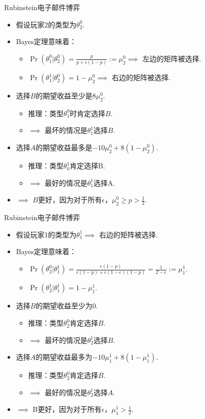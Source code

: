 \begin{frame}{Rubinstein电子邮件博弈}
\begin{itemize}
\item 假设玩家2的类型为$\theta_2^0$.
\item Bayes定理意味着：
\begin{itemize}
\item $\Pr(\theta_1^0|\theta_2^0) = \frac{p}{p+\epsilon(1-p)} := \mu_2^0\implies$  左边的矩阵被选择. 
\item $\Pr(\theta_1^1|\theta_2^0) = 1 - \mu_2^0\implies$ 右边的矩阵被选择. 
\end{itemize}
\item 选择$B$的期望收益至少是$8\mu_2^0$.
\begin{itemize}
\item 推理：类型$\theta_1^0$时肯定选择$B$.
\item $\implies$ 最坏的情况是$\theta_1^1$选择$B$.
\end{itemize}
\item 选择$A$的期望收益最多是$-10\mu_2^0 + 8(1 - \mu_2^0)$. 
\begin{itemize}
\item 推理：类型$\theta_0^1$肯定选择B. 
\item $\implies$ 最好的情况是$\theta_1^1$选择A. 

\end{itemize}
\item $\implies$ $B$更好，因为对于所有$\epsilon$，$\mu_2^0 \geq p > \frac{1}{2}$.
\end{itemize}
\end{frame}

\begin{frame}{Rubinstein电子邮件博弈}
\begin{itemize}
\item 假设玩家1的类型为$\theta_1^1$$\implies$ 右边的矩阵被选择. 
\item Bayes定理意味着：
\begin{itemize}
    \item $\Pr(\theta_2^0|\theta_1^1) = \frac{\epsilon(1-p)}{\epsilon(1-p)+\epsilon(1-\epsilon)(1-p)} = \frac{1}{2-\epsilon} := \mu_1^1$. 
\item $\Pr(\theta_2^1|\theta_1^1) = 1 - \mu_1^1$. 
\end{itemize}
\item 选择$B$的期望收益至少为$0$. 
\begin{itemize}
    \item 推理：类型$\theta_2^0$肯定选择$B$. 
    \item $\implies$ 最坏的情况是$\theta_2^1$选择$B$. 
\end{itemize}
\item 选择$A$的期望收益最多为$-10\mu_1^1 + 8(1 - \mu_1^1)$. 
\begin{itemize}
    \item 推理：类型$\theta_2^0$肯定选择$B$. 
\item $\implies$ 最好的情况是$\theta_2^1$选择$A$. 
\end{itemize}
\item $\implies$ B更好，因为对于所有$\epsilon$，$\mu_1^1 > \frac{1}{2}$. 
\end{itemize}
\end{frame}

